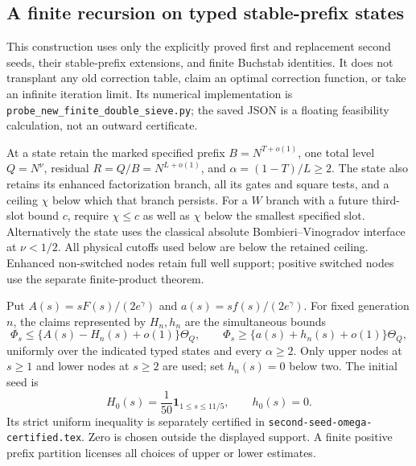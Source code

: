 \subsection{A finite recursion on typed stable-prefix states}
\label{sec:new-finite-double-sieve-recursion}

This construction uses only the explicitly proved first and replacement
second seeds, their stable-prefix extensions, and finite Buchstab
identities. It does not transplant any old correction table, claim an
optimal correction function, or take an infinite iteration limit.
Its numerical implementation is
\texttt{probe\_new\_finite\_double\_sieve.py}; the saved JSON is a
floating feasibility calculation, not an outward certificate.

At a state retain the marked specified prefix $B=N^{T+o(1)}$, one
total level $Q=N^\nu$, residual $R=Q/B=N^{L+o(1)}$, and
$\alpha=(1-T)/L\ge2$. The state also retains its enhanced
factorization branch, all its gates and square tests, and a ceiling
$\chi$ below which that branch persists. For a $W$ branch with a
future third-slot bound $c$, require $\chi\le c$ as well as
$\chi$ below the smallest specified slot. Alternatively the state
uses the classical absolute Bombieri--Vinogradov interface at
$\nu<1/2$. All physical cutoffs used below are below the retained
ceiling. Enhanced non-switched nodes retain full well support;
positive switched nodes use the separate finite-product theorem.

Put $A(s)=sF(s)/(2e^\gamma)$ and $a(s)=sf(s)/(2e^\gamma)$.
For fixed generation $n$, the claims represented by $H_n,h_n$ are
the simultaneous bounds
\[
 \Phi_s\le\{A(s)-H_n(s)+o(1)\}\Theta_Q,\qquad
 \Phi_s\ge\{a(s)+h_n(s)+o(1)\}\Theta_Q,
\]
uniformly over the indicated typed states and every $\alpha\ge2$.
Only upper nodes at $s\ge1$ and lower nodes at $s\ge2$ are used;
set $h_n(s)=0$ below two. The initial seed is
\[
 H_0(s)=\frac1{50}\mathbf1_{1\le s\le11/5},\qquad h_0(s)=0.
\]
Its strict uniform inequality is separately certified in
\texttt{second-seed-omega-certified.tex}. Zero is chosen outside
the displayed support. A finite positive prefix partition licenses
all choices of upper or lower estimates.

